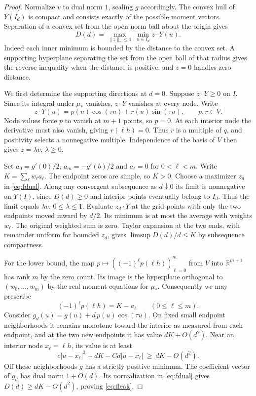 \documentclass[11pt,letterpaper]{article}
\theoremstyle{remark}\newtheorem{remark}[theorem]{Remark}
\begin{document}
\begin{proof}
Normalize $v$ to dual norm $1$, scaling $g$ accordingly. The convex hull of $Y(I_d)$ is compact and consists exactly of the possible moment vectors. Separation of a convex set from the open norm ball about the origin gives
\begin{equation}\label{eq:fdual}
 D(d)=\max_{\|z\|_*\le1}\ \min_{u\in I_d} z\cdot Y(u).
\end{equation}
Indeed each inner minimum is bounded by the distance to the convex set. A supporting hyperplane separating the set from the open ball of that radius gives the reverse inequality when the distance is positive, and $z=0$ handles zero distance.

We first determine the supporting directions at $d=0$. Suppose $z\cdot Y\ge0$ on $I$. Since its integral under $\mu_*$ vanishes, $z\cdot Y$ vanishes at every node. Write
\[
 z\cdot Y(u)=p(u)\cos(\tau u)+r(u)\sin(\tau u),\qquad p,r\in V.
\]
Node values force $p$ to vanish at $m+1$ points, so $p=0$. At each interior node the derivative must also vanish, giving $r(\ell h)=0$. Thus $r$ is a multiple of $q$, and positivity selects a nonnegative multiple. Independence of the basis of $V$ then gives $z=\lambda v$, $\lambda\ge0$.

Set $a_0=g'(0)/2$, $a_m=-g'(b)/2$ and $a_\ell=0$ for $0<\ell<m$. Write $K=\sum_\ell w_\ell a_\ell$. The endpoint zeros are simple, so $K>0$. Choose a maximizer $z_d$ in \eqref{eq:fdual}. Along any convergent subsequence as $d\downarrow0$ its limit is nonnegative on $Y(I)$, since $D(d)\ge0$ and interior points eventually belong to $I_d$. Thus the limit equals $\lambda v$, $0\le\lambda\le1$. Evaluate $z_d\cdot Y$ at the grid points with only the two endpoints moved inward by $d/2$. Its minimum is at most the average with weights $w_\ell$. The original weighted sum is zero. Taylor expansion at the two ends, with remainder uniform for bounded $z_d$, gives $\limsup D(d)/d\le K$ by subsequence compactness.

For the lower bound, the map $p\mapsto((-1)^\ell p(\ell h))_{\ell=0}^m$ from $V$ into $\mathbb R^{m+1}$ has rank $m$ by the zero count. Its image is the hyperplane orthogonal to $(w_0,\ldots,w_m)$ by the real moment equations for $\mu_*$. Consequently we may prescribe
\[
 (-1)^\ell p(\ell h)=K-a_\ell
 \qquad(0\le\ell\le m).
\]
Consider $g_d(u)=g(u)+d\,p(u)\cos(\tau u)$. On fixed small endpoint neighborhoods it remains monotone toward the interior as measured from each endpoint, and at the two new endpoints it has value $dK+O(d^2)$. Near an interior node $x_\ell=\ell h$, its value is at least
\[
 c|u-x_\ell|^2+dK-Cd|u-x_\ell|\ \ge\ dK-O(d^2).
\]
Off these neighborhoods $g$ has a strictly positive minimum. The coefficient vector of $g_d$ has dual norm $1+O(d)$. Its normalization in \eqref{eq:fdual} gives $D(d)\ge dK-O(d^2)$, proving \eqref{eq:fleak}.
\end{proof}
\end{document}
